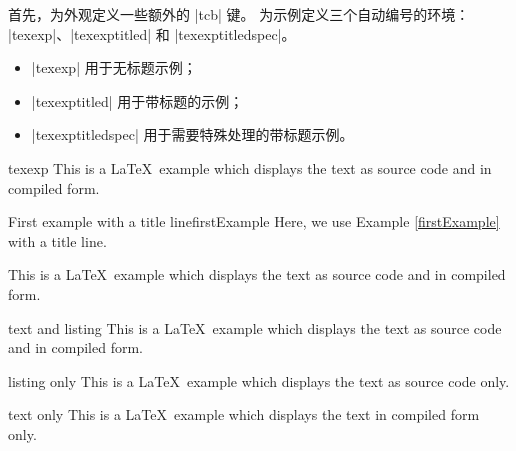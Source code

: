 首先，为外观定义一些额外的 |tcb| 键。
为示例定义三个自动编号的环境：
|texexp|、|texexptitled| 和 |texexptitledspec|。

\begin{itemize}
\item |texexp| 用于无标题示例；
\item |texexptitled| 用于带标题的示例；
\item |texexptitledspec| 用于需要特殊处理的带标题示例。
\end{itemize}


\begin{dispExample}
\begin{tcblisting}{texexp}
This is a \LaTeX\ example which displays the text as source code
and in compiled form.
\end{tcblisting}
\end{dispExample}


\begin{dispExample}
\begin{texexptitled}{First example with a title line}{firstExample}
Here, we use Example \ref{firstExample} with a title line.
\end{texexptitled}
\end{dispExample}


\begin{dispExample}
\begin{texexp}{}
This is a \LaTeX\ example which displays the text as source code
and in compiled form.
\end{texexp}
\end{dispExample}


\begin{dispExample}
\begin{texexp}{text and listing}
This is a \LaTeX\ example which displays the text as source code
and in compiled form.
\end{texexp}
\end{dispExample}


\begin{dispExample}
\begin{texexp}{listing only}
This is a \LaTeX\ example which displays the text as source code only.
\end{texexp}
\end{dispExample}


\begin{dispExample}
\begin{texexp}{text only}
This is a \LaTeX\ example which displays the text in compiled form only.
\end{texexp}
\end{dispExample}


